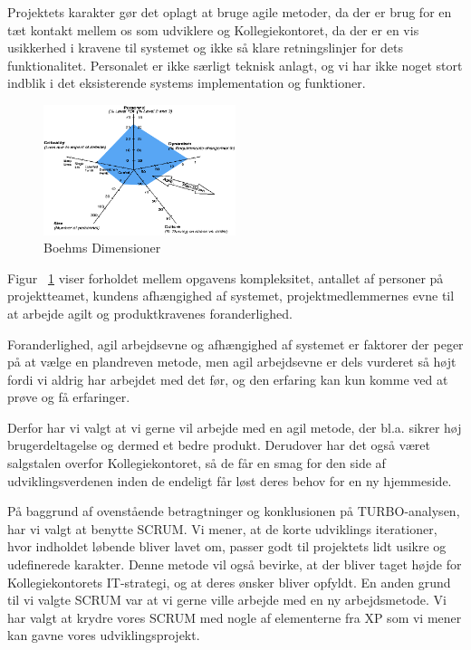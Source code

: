 \documentclass[12pt, a4paper]{report}
\begin{document}
Projektets karakter gør det oplagt at bruge agile metoder, da der er brug for en tæt kontakt mellem os som udviklere og Kollegiekontoret, da der er en vis usikkerhed i kravene til systemet og ikke så klare retningslinjer for dets funktionalitet. Personalet er ikke særligt teknisk anlagt, og vi har ikke noget stort indblik i det eksisterende systems implementation og funktioner.

\begin{figure}[ht]

\centering

\includegraphics[width=0.5\textwidth]{amoebe}

\caption{Boehms Dimensioner}

\label{amoeb}

\end{figure}

Figur ~\ref{amoeb} viser forholdet mellem opgavens kompleksitet, antallet af personer på projektteamet, kundens afhængighed af systemet, projektmedlemmernes evne til at arbejde agilt og produktkravenes foranderlighed.

Foranderlighed, agil arbejdsevne og afhængighed af systemet er faktorer der peger på at vælge en plandreven metode, men agil arbejdsevne er dels vurderet så højt fordi vi aldrig har arbejdet med det før, og den erfaring kan kun komme ved at prøve og få erfaringer.

Derfor har vi valgt at vi gerne vil arbejde med en agil metode, der bl.a. sikrer høj brugerdeltagelse og dermed et bedre produkt. Derudover har det også været salgstalen overfor Kollegiekontoret, så de får en smag for den side af udviklingsverdenen inden de endeligt får løst deres behov for en ny hjemmeside.

På baggrund af ovenstående betragtninger og konklusionen på TURBO-analysen, har vi valgt at benytte SCRUM. Vi mener, at de korte udviklings iterationer, hvor indholdet løbende bliver lavet om, passer godt til projektets lidt usikre og udefinerede karakter. Denne metode vil også bevirke, at der bliver taget højde for Kollegiekontorets IT-strategi, og at deres ønsker bliver opfyldt. En anden grund til vi valgte SCRUM var at vi gerne ville arbejde med en ny arbejdsmetode. Vi har valgt at krydre vores SCRUM med nogle af elementerne fra XP som vi mener kan gavne vores udviklingsprojekt.
\end{document}
